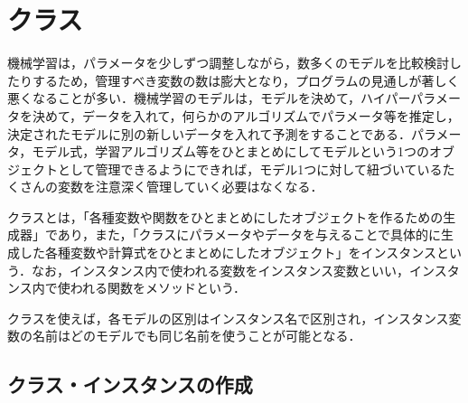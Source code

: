 \section{クラス}
機械学習は，パラメータを少しずつ調整しながら，数多くのモデルを比較検討したりするため，管理すべき変数の数は膨大となり，プログラムの見通しが著しく悪くなることが多い．機械学習のモデルは，モデルを決めて，ハイパーパラメータを決めて，データを入れて，何らかのアルゴリズムでパラメータ等を推定し，決定されたモデルに別の新しいデータを入れて予測をすることである．パラメータ，モデル式，学習アルゴリズム等をひとまとめにしてモデルという1つのオブジェクトとして管理できるようにできれば，モデル1つに対して紐づいているたくさんの変数を注意深く管理していく必要はなくなる．

クラスとは，「各種変数や関数をひとまとめにしたオブジェクトを作るための生成器」であり，また，「クラスにパラメータやデータを与えることで具体的に生成した各種変数や計算式をひとまとめにしたオブジェクト」をインスタンスという．なお，インスタンス内で使われる変数をインスタンス変数といい，インスタンス内で使われる関数をメソッドという．

クラスを使えば，各モデルの区別はインスタンス名で区別され，インスタンス変数の名前はどのモデルでも同じ名前を使うことが可能となる．

\subsection{クラス・インスタンスの作成}

